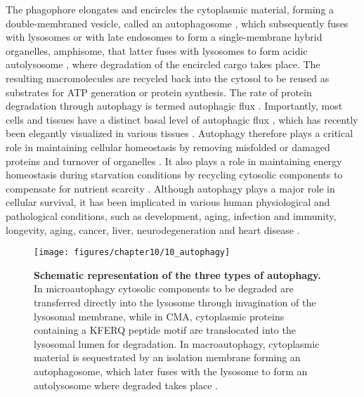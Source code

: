 The phagophore elongates and encircles the cytoplasmic material, forming a double-membraned vesicle, called an autophagosome \citep{Cai2012,Levine2008}, which subsequently fuses with lysosomes or with late endosomes to form a single-membrane hybrid organelles, amphisome, that latter fuses with lysosomes to form acidic autolysosome \citep{Cai2012,Nixon2011,sarkar2013}, where degradation of the encircled cargo takes place. The resulting macromolecules are recycled back into the cytosol to be reused as substrates for ATP generation or protein synthesis. The rate of protein degradation through autophagy is termed autophagic flux \citep{klionsky2016,loos2014}. Importantly, most cells and tissues have a distinct basal level of autophagic flux \citep{Mizushima2004a}, which has recently been elegantly visualized in various tissues \citep{Kaizuka2016}.  Autophagy therefore plays a critical role in maintaining cellular homeostasis by removing misfolded or damaged proteins and turnover of organelles \citep{Levine2008}. It also plays a role in maintaining energy homeostasis during starvation conditions by recycling cytosolic components to compensate for nutrient scarcity \citep{Levine2008,Loos2009}. Although autophagy plays a major role in cellular survival, it has been implicated in various human physiological and pathological conditions, such as development, aging, infection and immunity, longevity, aging, cancer, liver, neurodegeneration and heart disease \citep{Meijer2006,Mizushima2008,Ravikumar2010b,sarkar2013}.

\begin{figure}[!htbp]
  \texttt{[image: figures/chapter10/10\_autophagy]}
  \caption[Schematic representation of the types of autophagy types]{\textbf{Schematic representation of the three types of autophagy.} In microautophagy cytosolic components to be degraded are transferred directly into the lysosome through invagination of the lysosomal membrane, while in CMA, cytoplasmic proteins containing a KFERQ peptide motif are translocated into the lysosomal lumen for degradation. In macroautophagy, cytoplasmic material is sequestrated by an isolation membrane forming an autophagosome, which later fuses with the lysosome to form an autolysosome where degraded takes place \citep{Nikoletopoulou2015}.}
  \label{fig:10_autophagy}
  \end{figure}

